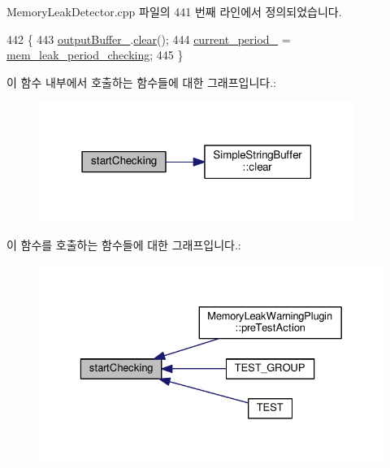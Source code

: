 Memory\+Leak\+Detector.\+cpp 파일의 441 번째 라인에서 정의되었습니다.


\begin{DoxyCode}
442 \{
443     \hyperlink{class_memory_leak_detector_a7d0b175420d83f9ee397b398ae14ac75}{outputBuffer\_}.\hyperlink{class_memory_leak_output_string_buffer_ac8bb3912a3ce86b15842e79d0b421204}{clear}();
444     \hyperlink{class_memory_leak_detector_af82b746b32f3ce3919db77a6985bab42}{current\_period\_} = \hyperlink{_memory_leak_detector_8h_ab248e6cc6c6699b88b002286d8a3ed76ad140291a5b8a535af47f9858220f2639}{mem\_leak\_period\_checking};
445 \}
\end{DoxyCode}


이 함수 내부에서 호출하는 함수들에 대한 그래프입니다.\+:
\nopagebreak
\begin{figure}[H]
\begin{center}
\leavevmode
\includegraphics[width=291pt]{class_memory_leak_detector_ae912c5ee9034b76f13f1c9dbab55e512_cgraph}
\end{center}
\end{figure}




이 함수를 호출하는 함수들에 대한 그래프입니다.\+:
\nopagebreak
\begin{figure}[H]
\begin{center}
\leavevmode
\includegraphics[width=329pt]{class_memory_leak_detector_ae912c5ee9034b76f13f1c9dbab55e512_icgraph}
\end{center}
\end{figure}


